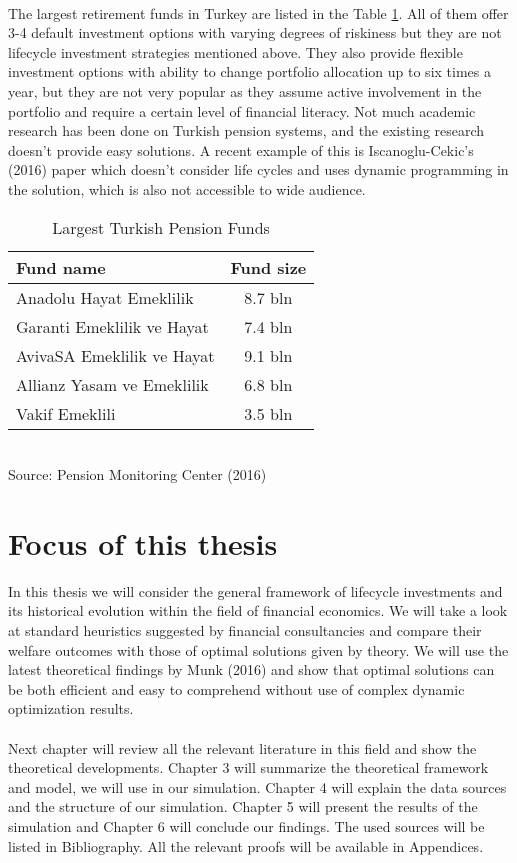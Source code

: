 \paragraph*{}
The largest retirement funds in Turkey are listed in the Table \ref{table:emekli}. All of them offer 3-4 default investment options with varying degrees of riskiness but they are not lifecycle investment strategies mentioned above. They also provide flexible investment options with ability to change portfolio allocation up to six times a year, but they are not very popular as they assume active involvement in the portfolio and require a certain level of financial literacy. Not much academic research has been done on Turkish pension systems, and the existing research doesn't provide easy solutions. A recent example of this is Iscanoglu-Cekic's (2016) paper which doesn't consider life cycles and uses dynamic programming in the solution, which is also not accessible to wide audience.

\begin{table}
	\centering
	\caption{Largest Turkish Pension Funds}
	\label{table:emekli}
	\begin{tabular}[H]{lc}
		\hline
		Fund name&Fund size\\
		\hline
		Anadolu Hayat Emeklilik&8.7 bln\\
		Garanti Emeklilik ve Hayat&7.4 bln\\
		AvivaSA Emeklilik ve Hayat&9.1 bln\\
		Allianz Yasam ve Emeklilik&6.8 bln\\
		Vakif Emeklili&3.5 bln\\
		\hline
	\end{tabular}\\
	Source: Pension Monitoring Center (2016)
\end{table}

\section{Focus of this thesis}
In this thesis we will consider the general framework of lifecycle investments and its historical evolution within the field of financial economics. We will take a look at standard heuristics suggested by financial consultancies and compare their welfare outcomes with those of optimal solutions given by theory. We will use the latest theoretical findings by Munk (2016) and show that optimal solutions can be both efficient and easy to comprehend without use of complex dynamic optimization results.
\paragraph*{}Next chapter will review all the relevant literature in this field and show the theoretical developments. Chapter 3 will summarize the theoretical framework and model, we will use in our simulation. Chapter 4 will explain the data sources and the structure of our simulation. Chapter 5 will present the results of the simulation and Chapter 6 will conclude our findings. The used sources will be listed in Bibliography. All the relevant proofs will be available in Appendices. 
